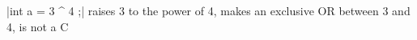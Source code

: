 \verbdef\arg|int a = 3 ^ 4 ;|
\AQquestion{\arg}
{{raises 3 to the power of 4},
 {makes an exclusive OR between 3 and 4},
 {is not a C}}
